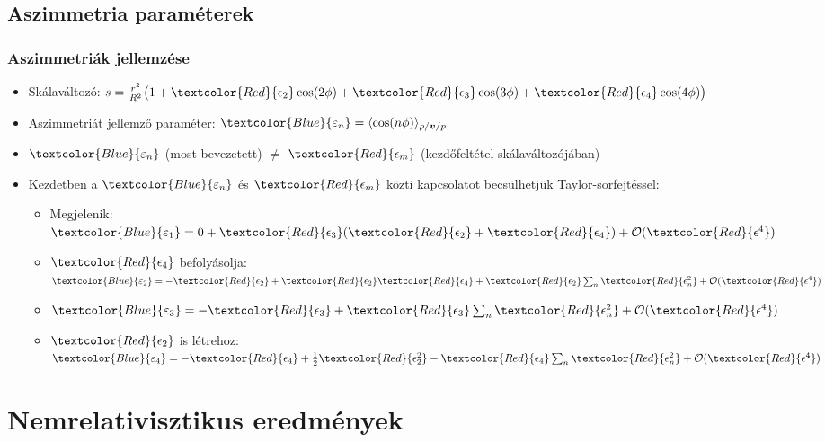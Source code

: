\documentclass{beamer}
\begin{document}
\subsection{Aszimmetria paraméterek}
\begin{frame}
\frametitle{Aszimmetriák jellemzése}
\begin{itemize}
  \setlength{\itemsep}{12pt}
\item<1-> Skálaváltozó: $s=\frac{r^2}{R^2}\big(1+\textcolor{Red}{\epsilon_2}\cos(2\phi)+\textcolor{Red}{\epsilon_3}\cos(3\phi)+\textcolor{Red}{\epsilon_4}\cos(4\phi)\big)$
\item<1-> Aszimmetriát jellemző paraméter: $\textcolor{Blue}{\varepsilon_n}=\langle \cos(n\phi)\rangle_{\rho/\bm{v}/p}$
\item<2-> $\textcolor{Blue}{\varepsilon_n}$ (most bevezetett)  $\neq$ $\textcolor{Red}{\epsilon_m}$  (kezdőfeltétel skálaváltozójában)
\item<3-> Kezdetben a $\textcolor{Blue}{\varepsilon_n}$ és $\textcolor{Red}{\epsilon_m}$ közti kapcsolatot becsülhetjük Taylor-sorfejtéssel:
\vspace{10pt}
\begin{itemize}
 \setlength{\itemsep}{8pt}
\item<3-> Megjelenik: $\textcolor{Blue}{\varepsilon_1}=0+\textcolor{Red}{\epsilon_3}(\textcolor{Red}{\epsilon_2}+\textcolor{Red}{\epsilon_4})+\mathcal{O}(\textcolor{Red}{\epsilon^4})$
\item<3-> $\textcolor{Red}{\epsilon_4}$ befolyásolja: $\textcolor{Blue}{\varepsilon_2}=-\textcolor{Red}{\epsilon_2}+\textcolor{Red}{\epsilon_2}\textcolor{Red}{\epsilon_4}+\textcolor{Red}{\epsilon_2}\sum_{n} \textcolor{Red}{\epsilon_n^2}+\mathcal{O}(\textcolor{Red}{\epsilon^4})$
\item<3-> $\textcolor{Blue}{\varepsilon_3}=-\textcolor{Red}{\epsilon_3}+\textcolor{Red}{\epsilon_3}\sum_n \textcolor{Red}{\epsilon_n^2}+\mathcal{O}(\textcolor{Red}{\epsilon^4})$
\item<3-> $\textcolor{Red}{\epsilon_2}$ is létrehoz: $\textcolor{Blue}{\varepsilon_4}=-\textcolor{Red}{\epsilon_4}+\frac{1}{2}\textcolor{Red}{\epsilon_2^2}-\textcolor{Red}{\epsilon_4}\sum_n\textcolor{Red}{\epsilon_n^2}+\mathcal{O}(\textcolor{Red}{\epsilon^4})$
\end{itemize}
\end{itemize}

\end{frame}

\section{Nemrelativisztikus eredmények}
\end{document}
